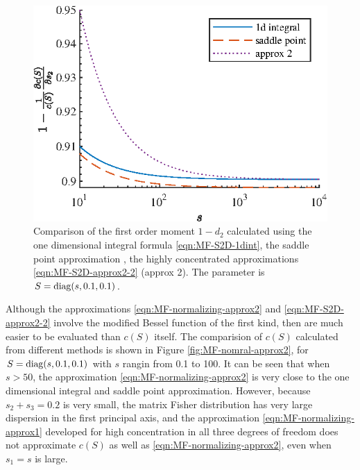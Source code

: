 \begin{figure}
	\centering
	\includegraphics[scale=1.4]{figures/MF-S2D-approx2-2}
	\caption[Comparison of the first order moment $1-d_2$ calculated using different methods.]{Comparison of the first order moment $1-d_2$ calculated using the one dimensional integral formula \eqref{eqn:MF-S2D-1dint}, the saddle point approximation \cite{kume2005saddlepoint,kume2007derivatives}, the highly concentrated approximations \eqref{eqn:MF-S2D-approx2-2} (approx 2).
	The parameter is $S = \mathrm{diag}(s,0.1,0.1)$.
	\label{fig:MF-S2D-approx2-2}}
\end{figure}

Although the approximations \eqref{eqn:MF-normalizing-approx2} and \eqref{eqn:MF-S2D-approx2-2} involve the modified Bessel function of the first kind, then are much easier to be evaluated than $c(S)$ itself.
The comparision of $c(S)$ calculated from different methods is shown in Figure \ref{fig:MF-nomral-approx2}, for $S = \mathrm{diag}(s,0.1,0.1)$ with $s$ rangin from 0.1 to 100.
It can be seen that when $s>50$, the approximation \eqref{eqn:MF-normalizing-approx2} is very close to the one dimensional integral and saddle point approximation.
However, because $s_2+s_3 = 0.2$ is very small, the matrix Fisher distribution has very large dispersion in the first principal axis, and the approximation \eqref{eqn:MF-normalizing-approx1} developed for high concentration in all three degrees of freedom does not approximate $c(S)$ as well as \eqref{eqn:MF-normalizing-approx2}, even when $s_1 = s$ is large.

